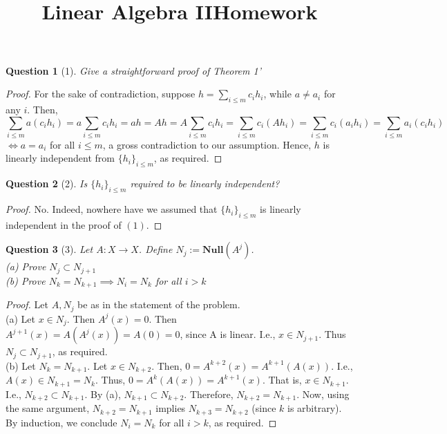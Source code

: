 \documentclass[11pt]{article}
\title{\vspace{-50pt}
\Huge \name
\\\vspace{20pt}
\huge Linear Algebra II\hfill Homework \hw}
\author{}
\date{}
\theoremstyle{quest}
\newtheorem*{question}{Question}
\begin{document}
\maketitle

\begin{question}[1]
Give a straightforward proof of Theorem 1'
\end{question}
\begin{proof}
  For the sake of contradiction, suppose $h = \sum_{i \le m} c_i h_i$, while $a \ne a_i$ for any $i$. Then,
  $$\sum_{i \le m} a (c_i h_i) = a \sum_{i \le m} c_i h_i = ah = Ah = A \sum_{i \le m} c_i h_i = \sum_{i \le m} c_i (A h_i) = \sum_{i \le m} c_i (a_i h_i) = \sum_{i \le m} a_i (c_i h_i)$$ $\iff a = a_i$ for all $i \le m$, a gross contradiction to our assumption. Hence, $h$ is linearly independent from $\{h_i\}_{i \le m}$, as required.
\end{proof}

\begin{question}[2]
Is $\{h_i\}_{i \le m}$ required to be linearly independent?
\end{question}
\begin{proof}
  No. Indeed, nowhere have we assumed that $\{h_i\}_{i \le m}$ is linearly independent in the proof of $(1)$.
\end{proof}

\begin{question}[3]
Let $A: X \rightarrow X$. Define $N_j := \mathbf{Null}(A^j)$.
\\(a) Prove $N_j \subset N_{j+1}$
\\(b) Prove $N_k = N_{k+1} \implies N_i = N_k$ for all $i > k$
\end{question}
\begin{proof}
  Let $A, N_j$ be as in the statement of the problem.
  \\(a) Let $x \in N_j$. Then $A^j(x) = 0$. Then $A^{j+1}(x) = A(A^j(x)) = A(0) = 0$, since A is linear. I.e., $x \in N_{j+1}$. Thus $N_j \subset N_{j+1}$, as required.
  \\(b) Let $N_k = N_{k+1}$. Let $x \in N_{k+2}$. Then, $0 = A^{k+2}(x) = A^{k+1}(A(x))$. I.e., $A(x) \in N_{k+1} = N_k$. Thus, $0 = A^k(A(x)) = A^{k+1}(x)$. That is, $x \in N_{k+1}$. I.e., $N_{k+2} \subset N_{k+1}$. By (a), $N_{k+1} \subset N_{k+2}$. Therefore, $N_{k+2} = N_{k+1}$. Now, using the same argument, $N_{k+2} = N_{k+1}$ implies $N_{k+3} = N_{k+2}$ (since $k$ is arbitrary). By induction, we conclude $N_i = N_k$ for all $i > k$, as required.
\end{proof}
\end{document}
